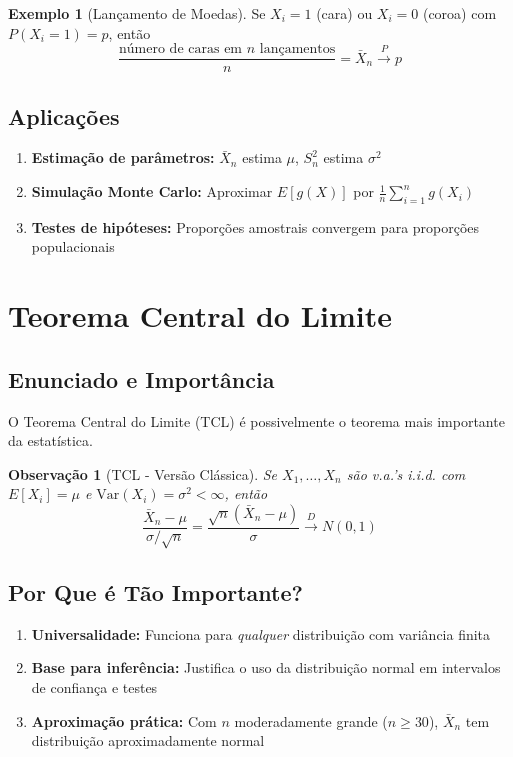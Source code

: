 \documentclass[12pt,a4paper]{article}
\theoremstyle{definition}
\newtheorem{exemplo}{Exemplo}[section]
\theoremstyle{plain}
\newtheorem{observacao}{Observação}[section]
\begin{document}
\begin{exemplo}[Lançamento de Moedas]
Se $X_i = 1$ (cara) ou $X_i = 0$ (coroa) com $P(X_i = 1) = p$, então
\[
\frac{\text{número de caras em } n \text{ lançamentos}}{n} = \bar{X}_n \xrightarrow{P} p
\]
\end{exemplo}

\subsection{Aplicações}

\begin{enumerate}
    \item \textbf{Estimação de parâmetros:} $\bar{X}_n$ estima $\mu$, $S_n^2$ estima $\sigma^2$
    
    \item \textbf{Simulação Monte Carlo:} Aproximar $E[g(X)]$ por $\frac{1}{n}\sum_{i=1}^n g(X_i)$
    
    \item \textbf{Testes de hipóteses:} Proporções amostrais convergem para proporções populacionais
\end{enumerate}

\section{Teorema Central do Limite}

\subsection{Enunciado e Importância}

O Teorema Central do Limite (TCL) é possivelmente o teorema mais importante da estatística.

\begin{observacao}[TCL - Versão Clássica]
Se $X_1, \ldots, X_n$ são v.a.'s i.i.d. com $E[X_i] = \mu$ e $\text{Var}(X_i) = \sigma^2 < \infty$, então
\[
\frac{\bar{X}_n - \mu}{\sigma/\sqrt{n}} = \frac{\sqrt{n}(\bar{X}_n - \mu)}{\sigma} \xrightarrow{D} N(0, 1)
\]
\end{observacao}

\subsection{Por Que é Tão Importante?}

\begin{enumerate}
    \item \textbf{Universalidade:} Funciona para \emph{qualquer} distribuição com variância finita
    
    \item \textbf{Base para inferência:} Justifica o uso da distribuição normal em intervalos de confiança e testes
    
    \item \textbf{Aproximação prática:} Com $n$ moderadamente grande ($n \geq 30$), $\bar{X}_n$ tem distribuição aproximadamente normal
\end{enumerate}
\end{document}
